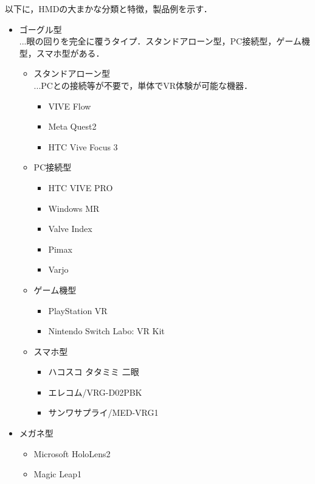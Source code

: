             以下に，HMDの大まかな分類と特徴，製品例を示す．
            \begin{itemize}
            \item ゴーグル型\\
                ...眼の回りを完全に覆うタイプ．スタンドアローン型，PC接続型，ゲーム機型，スマホ型がある．
                \begin{itemize}
                \item スタンドアローン型\\
                    ...PCとの接続等が不要で，単体でVR体験が可能な機器．
                    \begin{itemize}
                    \item VIVE Flow
                    \item Meta Quest2
                    \item HTC Vive Focus 3
                    \end{itemize}
                \item PC接続型
                    \begin{itemize}
                    \item HTC VIVE PRO
                    \item Windows MR
                    \item Valve Index
                    \item Pimax
                    \item Varjo
                    \end{itemize}
                \item ゲーム機型
                    \begin{itemize}
                    \item PlayStation VR
                    \item Nintendo Switch Labo: VR Kit
                    \end{itemize}
                \item スマホ型
                    \begin{itemize}
                    \item ハコスコ タタミミ 二眼
                    \item エレコム/VRG-D02PBK
                    \item サンワサプライ/MED-VRG1
                    \end{itemize}
                \end{itemize}

            \item メガネ型
                \begin{itemize}
                \item Microsoft HoloLens2
                \item Magic Leap1
                \end{itemize}
            \end{itemize}

